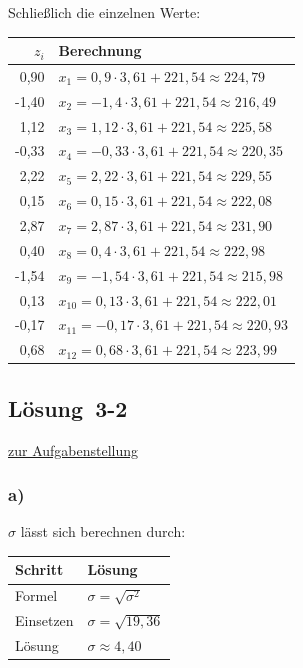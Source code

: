 \documentclass[
  11pt,
  ngerman,
  a4paper,
]{report}
\begin{document}
Schließlich die einzelnen Werte:

\begin{table}[H]
\centering
\begin{tabular}{rl}
\toprule
\textbf{$z_i$} & \textbf{Berechnung}\\
\midrule
0,90 & $x_{1} = 0{,}9 \cdot 3{,}61 + 221{,}54\approx224{,}79$\\
-1,40 & $x_{2} = -1{,}4 \cdot 3{,}61 + 221{,}54\approx216{,}49$\\
1,12 & $x_{3} = 1{,}12 \cdot 3{,}61 + 221{,}54\approx225{,}58$\\
-0,33 & $x_{4} = -0{,}33 \cdot 3{,}61 + 221{,}54\approx220{,}35$\\
2,22 & $x_{5} = 2{,}22 \cdot 3{,}61 + 221{,}54\approx229{,}55$\\
0,15 & $x_{6} = 0{,}15 \cdot 3{,}61 + 221{,}54\approx222{,}08$\\
2,87 & $x_{7} = 2{,}87 \cdot 3{,}61 + 221{,}54\approx231{,}90$\\
0,40 & $x_{8} = 0{,}4 \cdot 3{,}61 + 221{,}54\approx222{,}98$\\
-1,54 & $x_{9} = -1{,}54 \cdot 3{,}61 + 221{,}54\approx215{,}98$\\
0,13 & $x_{10} = 0{,}13 \cdot 3{,}61 + 221{,}54\approx222{,}01$\\
-0,17 & $x_{11} = -0{,}17 \cdot 3{,}61 + 221{,}54\approx220{,}93$\\
0,68 & $x_{12} = 0{,}68 \cdot 3{,}61 + 221{,}54\approx223{,}99$\\
\bottomrule
\end{tabular}
\end{table}

\hypertarget{loesung-3-2}{%
\subsection{Lösung~3-2}\label{loesung-3-2}}

\protect\hyperlink{aufgabe-3-2}{zur Aufgabenstellung}

\hypertarget{a-9}{%
\subsubsection{a)}\label{a-9}}

\(\sigma\) lässt sich berechnen durch:

\begin{table}[H]
\centering
\begin{tabular}{ll}
\toprule
\textbf{Schritt} & \textbf{Lösung}\\
\midrule
Formel & $\sigma=\sqrt{\sigma^2}$\\
Einsetzen & $\sigma=\sqrt{19{,}36}$\\
Lösung & $\sigma\approx4{,}40$\\
\bottomrule
\end{tabular}
\end{table}
\end{document}
